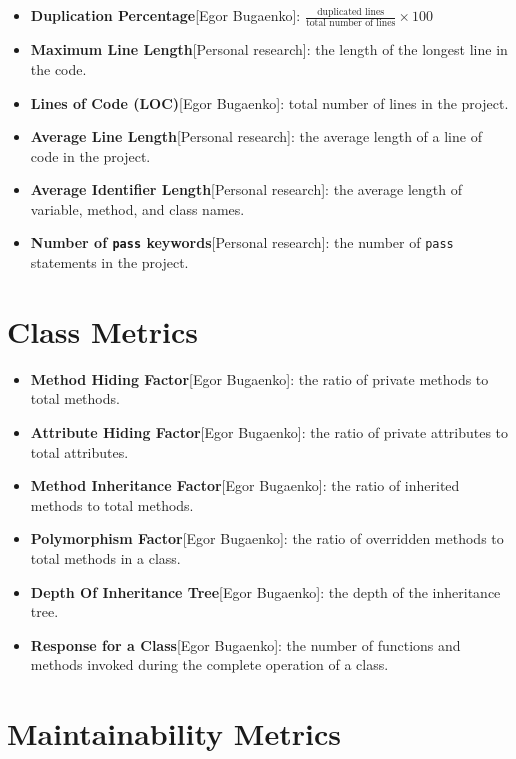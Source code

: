\documentclass{article}
\begin{document}
\begin{itemize}
    \item \textbf{Duplication Percentage}[Egor Bugaenko]: \(\frac{\text{duplicated lines}}{\text{total number of lines}} \times 100\)
    \item \textbf{Maximum Line Length}[Personal research]: the length of the longest line in the code.
    \item \textbf{Lines of Code (LOC)}[Egor Bugaenko]: total number of lines in the project.
    \item \textbf{Average Line Length}[Personal research]: the average length of a line of code in the project.
    \item \textbf{Average Identifier Length}[Personal research]: the average length of variable, method, and class names.
    \item \textbf{Number of \texttt{pass} keywords}[Personal research]: the number of \texttt{pass} statements in the project.
\end{itemize}

\section{Class Metrics}

\begin{itemize}
    \item \textbf{Method Hiding Factor}[Egor Bugaenko]: the ratio of private methods to total methods.
    \item \textbf{Attribute Hiding Factor}[Egor Bugaenko]: the ratio of private attributes to total attributes.
    \item \textbf{Method Inheritance Factor}[Egor Bugaenko]: the ratio of inherited methods to total methods.
    \item \textbf{Polymorphism Factor}[Egor Bugaenko]: the ratio of overridden methods to total methods in a class.
    \item \textbf{Depth Of Inheritance Tree}[Egor Bugaenko]: the depth of the inheritance tree.
    \item \textbf{Response for a Class}[Egor Bugaenko]: the number of functions and methods invoked during the complete operation of a class.
\end{itemize}

\section{Maintainability Metrics}
\end{document}
